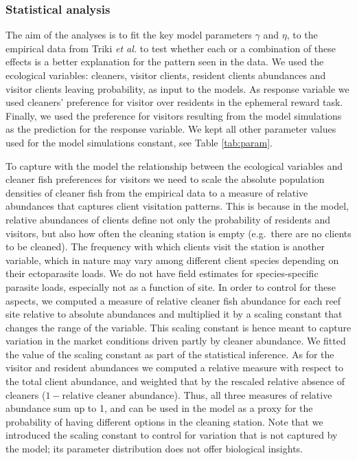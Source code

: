 \documentclass[]{rsos}%
\begin{document}
\hypertarget{statistical-analysis}{%
\subsubsection{Statistical analysis}\label{statistical-analysis}}

The aim of the analyses is to fit the key model parameters
\(\gamma\) and \(\eta\), to the empirical data from Triki \emph{et al.}
\citep{triki_Biological_2019, triki_Brain_2020} to test whether each or
a combination of these effects is a better explanation for the pattern
seen in the data. We used the
ecological variables: cleaners, visitor clients,
resident clients abundances and
visitor clients leaving probability, as input to the models.
As response variable we used cleaners' preference for visitor
over residents in the ephemeral reward task.
Finally, we used the preference for visitors resulting from the
model simulations as the prediction for the response variable.
We kept all other parameter values used for the model simulations constant,
see Table \ref{tab:param}.

To capture with the model the relationship between the ecological
variables and cleaner fish preferences for visitors we need to scale
the absolute population densities of cleaner fish from the empirical data
to a measure of relative abundances that captures
client visitation patterns. This is because in the model, relative
abundances of clients define not only the probability of residents and visitors,
but also how often the cleaning station is empty (e.g.~there are no
clients to be cleaned). The frequency with which clients visit the station
is another variable, which in nature may vary among different client species
depending on their ectoparasite loads. We do not have field estimates
for species-specific parasite loads, especially not as a function of site.
In order to control for these aspects, we computed a measure of relative
cleaner fish abundance for each reef site relative to
absolute abundances and multiplied it
by a scaling constant that changes the range of the variable. This scaling
constant is hence meant to capture variation in the market conditions driven
partly by cleaner abundance. We fitted the value of the scaling constant as
part of the statistical inference. As for the visitor and resident
abundances we computed a relative measure with respect to the
total client abundance, and weighted that by the rescaled relative absence
of cleaners (\(1-\text{relative cleaner abundance}\)). Thus, all three measures
of relative abundance sum up to 1, and can be used in the model as a proxy
for the probability of having different options in the cleaning station.
Note that we introduced the scaling constant to control for variation that
is not captured by the model; its parameter distribution does not offer
biological insights.
\end{document}
